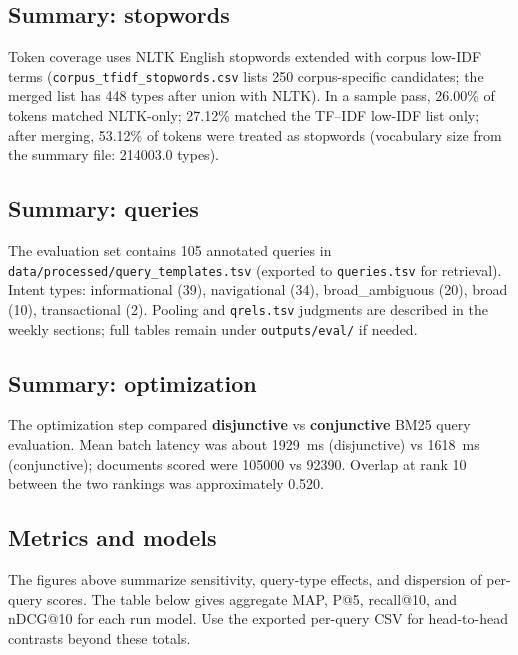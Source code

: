 \subsection*{Summary: stopwords}

Token coverage uses NLTK English stopwords extended with corpus low-IDF terms (\texttt{corpus\_tfidf\_stopwords.csv} lists 250 corpus-specific candidates; the merged list has 448 types after union with NLTK). In a sample pass, 26.00\% of tokens matched NLTK-only; 27.12\% matched the TF--IDF low-IDF list only; after merging, 53.12\% of tokens were treated as stopwords (vocabulary size from the summary file: 214003.0 types).

\subsection*{Summary: queries}

The evaluation set contains 105 annotated queries in \texttt{data/processed/query\_templates.tsv} (exported to \texttt{queries.tsv} for retrieval). Intent types: informational (39), navigational (34), broad\_ambiguous (20), broad (10), transactional (2). Pooling and \texttt{qrels.tsv} judgments are described in the weekly sections; full tables remain under \texttt{outputs/eval/} if needed.

\subsection*{Summary: optimization}

The optimization step compared \textbf{disjunctive} vs \textbf{conjunctive} BM25 query evaluation. Mean batch latency was about 1929~ms (disjunctive) vs 1618~ms (conjunctive); documents scored were 105000 vs 92390. Overlap at rank 10 between the two rankings was approximately 0.520.

\subsection*{Metrics and models}

The figures above summarize sensitivity, query-type effects, and dispersion of per-query scores. The table below gives aggregate MAP, P@5, recall@10, and nDCG@10 for each run model. Use the exported per-query CSV for head-to-head contrasts beyond these totals.

